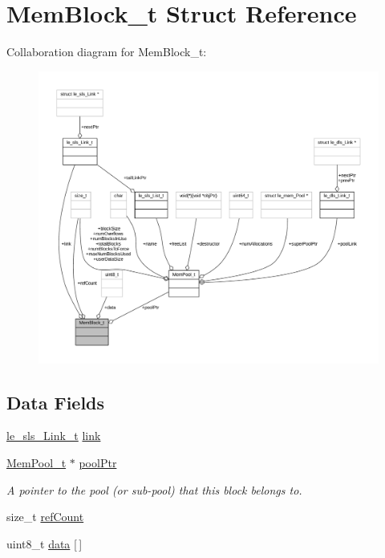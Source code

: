 \hypertarget{struct_mem_block__t}{}\section{Mem\+Block\+\_\+t Struct Reference}
\label{struct_mem_block__t}


Collaboration diagram for Mem\+Block\+\_\+t\+:
\nopagebreak
\begin{figure}[H]
\begin{center}
\leavevmode
\includegraphics[width=350pt]{struct_mem_block__t__coll__graph}
\end{center}
\end{figure}
\subsection*{Data Fields}
\begin{DoxyCompactItemize}
\item 
\hyperlink{structle__sls___link__t}{le\+\_\+sls\+\_\+\+Link\+\_\+t} \hyperlink{struct_mem_block__t_a92958a9db98d763100a51b11733fe970}{link}
\item 
\hyperlink{struct_mem_pool__t}{Mem\+Pool\+\_\+t} $\ast$ \hyperlink{struct_mem_block__t_a0e137ad966d8a91f13d8b78c6d353314}{pool\+Ptr}
\begin{DoxyCompactList}\small\item\em A pointer to the pool (or sub-\/pool) that this block belongs to. \end{DoxyCompactList}\item 
size\+\_\+t \hyperlink{struct_mem_block__t_a7ef3e21f8e3a69b45bfeba1d89ca2737}{ref\+Count}
\item 
uint8\+\_\+t \hyperlink{struct_mem_block__t_af21d99beab2de7545d5abb599e82244f}{data} \mbox{[}$\,$\mbox{]}
\end{DoxyCompactItemize}


